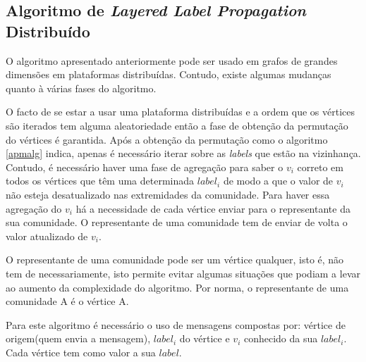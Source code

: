 \newpage
\subsection{Algoritmo de \textit{Layered Label Propagation} Distribuído}

O algoritmo apresentado anteriormente pode ser usado em grafos de grandes
dimensões em plataformas distribuídas. Contudo, existe algumas mudanças quanto 
à várias fases do algoritmo. 

  O facto de se estar a usar uma plataforma distribuídas e a ordem que os 
vértices são iterados tem alguma aleatoriedade então a fase de obtenção da 
permutação do vértices é garantida. Após a obtenção da permutação como o 
algoritmo \ref{apmalg} indica, apenas é necessário iterar sobre as 
\textit{labels} que estão na vizinhança. Contudo, é necessário haver uma fase 
de agregação para saber o $v_i$ correto em todos os vértices que têm uma 
determinada $label_i$ de modo a que o valor de $v_i$ não esteja desatualizado 
nas extremidades da comunidade. Para haver essa agregação do $v_i$ há a 
necessidade de cada vértice enviar para o representante da sua comunidade. O 
representante de uma comunidade tem de enviar de volta o valor atualizado de 
$v_i$.

O representante de uma comunidade pode ser um vértice qualquer, isto é, não 
tem de necessariamente, isto permite evitar algumas situações que 
podiam a levar ao aumento da complexidade do algoritmo. Por norma, o 
representante de uma comunidade A é o vértice A.

Para este algoritmo é necessário o uso de mensagens compostas por: vértice de 
origem(quem envia a mensagem), $label_i$ do vértice e $v_i$ conhecido da sua 
$label_i$. Cada vértice tem como valor a sua $label$.

